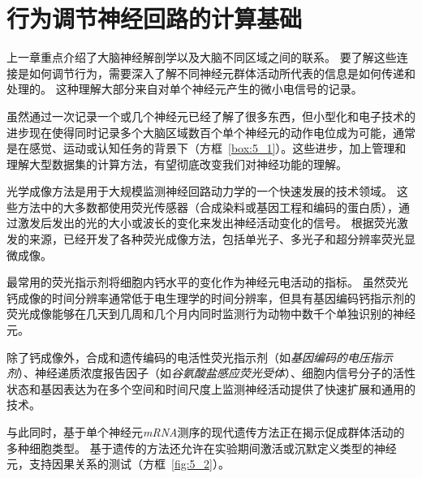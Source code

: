\chapter{行为调节神经回路的计算基础} \label{chap:chap5}

上一章重点介绍了大脑神经解剖学以及大脑不同区域之间的联系。
要了解这些连接是如何调节行为，需要深入了解不同神经元群体活动所代表的信息是如何传递和处理的。
这种理解大部分来自对单个神经元产生的微小电信号的记录。


虽然通过一次记录一个或几个神经元已经了解了很多东西，但小型化和电子技术的进步现在使得同时记录多个大脑区域数百个单个神经元的动作电位成为可能，通常是在感觉、运动或认知任务的背景下（方框~\ref{box:5_1}）。这些进步，加上管理和理解大型数据集的计算方法，有望彻底改变我们对神经功能的理解。


\begin{proposition}[光学神经成像] \label{box:5_1}
	
	\quad \quad 光学成像方法是用于大规模监测神经回路动力学的一个快速发展的技术领域。
	这些方法中的大多数都使用荧光传感器（合成染料或基因工程和编码的蛋白质），通过激发后发出的光的大小或波长的变化来发出神经活动变化的信号。
	根据荧光激发的来源，已经开发了各种荧光成像方法，包括单光子、多光子和超分辨率荧光显微成像。
	
	\quad \quad 最常用的荧光指示剂将细胞内钙水平的变化作为神经元电活动的指标。
	虽然荧光钙成像的时间分辨率通常低于电生理学的时间分辨率，但具有基因编码钙指示剂的荧光成像能够在几天到几周和几个月内同时监测行为动物中数千个单独识别的神经元。
	
	\quad \quad 除了钙成像外，合成和遗传编码的电活性荧光指示剂（如\textit{基因编码的电压指示剂}）、神经递质浓度报告因子（如\textit{谷氨酸盐感应荧光受体}）、细胞内信号分子的活性状态和基因表达为在多个空间和时间尺度上监测神经活动提供了快速扩展和通用的技术。
	
\end{proposition}


与此同时，基于单个神经元\textit{mRNA}测序的现代遗传方法正在揭示促成群体活动的多种细胞类型。
基于遗传的方法还允许在实验期间激活或沉默定义类型的神经元，支持因果关系的测试（方框~\ref{fig:5_2}）。


